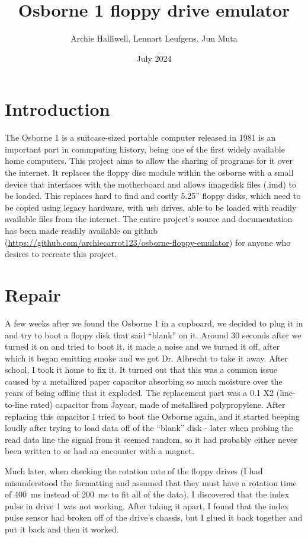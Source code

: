 \documentclass[a4paper]{article}
\begin{document}
\title{Osborne 1 floppy drive emulator}
\date{July 2024}
\author{Archie Halliwell, Lennart Leufgens, Jun Muta}
\maketitle

\section{Introduction}

The Osborne 1 is a suitcase-sized portable computer released in 1981
is an important part in commputing history, being one of the first
widely available home computers. This project aims to allow the
sharing of programs for it over the internet. It replaces the floppy
disc module within the osborne with a small device that interfaces
with the motherboard and allows imagedisk files (.imd) to be
loaded. This replaces hard to find and costly 5.25'' floppy disks,
which need to be copied using legacy hardware, with usb drives, able
to be loaded with readily available files from the internet. The
entire project's source and documentation has been made readily
available on github
(\url{https://github.com/archiecarrot123/osborne-floppy-emulator}) for
anyone who desires to recreate this project.

\section{Repair}

A few weeks after we found the Osborne 1 in a cupboard, we decided to
plug it in and try to boot a floppy disk that said ``blank'' on
it. Around 30 seconds after we turned it on and tried to boot it, it
made a noise and we turned it off, after which it began emitting smoke
and we got Dr. Albrecht to take it away. After school, I took it home
to fix it. It turned out that this was a common issue caused by a
metallized paper capacitor absorbing so much moisture over the years
of being offline that it exploded. The replacement part was a
\qty{0.1}{\uF} X2 (line-to-line rated) capacitor from Jaycar, made of
metallised polypropylene. After replacing this capacitor I tried to
boot the Osborne again, and it started beeping loudly after trying to
load data off of the ``blank'' disk - later when probing the read data
line the signal from it seemed random, so it had probably either never
been written to or had an encounter with a magnet.

Much later, when checking the rotation rate of the floppy drives (I
had misunderstood the formatting and assumed that they must have a
rotation time of \qty{400}{\ms} instead of \qty{200}{\ms} to fit all
of the data), I discovered that the index pulse in drive 1 was not
working. After taking it apart, I found that the index pulse sensor
had broken off of the drive's chassis, but I glued it back together
and put it back and
then it worked.
\end{document}

